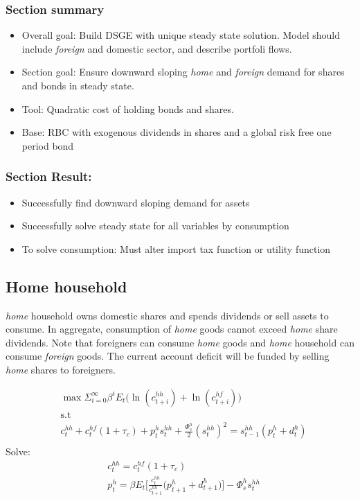 \documentclass[a4paper]{article}
\begin{document}
\subsubsection{Section summary}
\begin{itemize}
\item Overall goal: Build DSGE with unique steady state solution. Model should include \emph{foreign} and domestic sector, and describe portfoli flows. 
\item Section goal: Ensure downward sloping \emph{home} and \emph{foreign} demand for shares and bonds in steady state. 
\item Tool: Quadratic cost of holding bonds and shares. 
\item Base: RBC with exogenous dividends in shares and a global risk free one period bond
\end{itemize}

\subsubsection{Section Result:}
\begin{itemize}
\item Successfully find downward sloping demand for assets
\item Successfully solve steady state for all variables by consumption
\item To solve consumption: Must alter import tax function or utility function
\end{itemize}

\subsection{Home household}
\emph{home} household owns domestic shares and spends dividends or sell assets to consume. In aggregate, consumption of \emph{home} goods cannot exceed \emph{home} share dividends. Note that foreigners can consume \emph{home} goods and \emph{home} household can consume \emph{foreign} goods. The current account deficit will be funded by selling \emph{home} shares to foreigners. 

\begin{align*}
&\max \Sigma_{i=0}^\infty \beta^i E_t \bigg(\ln(c^{hh}_{t+i})+ \ln(c^{hf}_{t+i}) \bigg)\\ &\text{s.t}\\
&c^{hh}_t+c^{hf}_t(1+\tau_c)+ p^{h}_t s^{hh}_t+\frac{\Phi^h_s}{2}(s^{hh}_t)^2 =s^{hh}_{t-1}(p^{h}_t+d^{h}_t)\\
\end{align*}
Solve:
\begin{align}
&c^{hh}_t=c^{hf}_t(1+\tau_c)\\
&p^{h}_t=\beta E_t \bigg[\frac{c^{hh}_t}{c^{hh}_{t+1}} \bigg(  p^{h}_{t+1}+d^{h}_{t+1} \bigg) \bigg] - \Phi^h_s s^{hh}_t
\end{align}
\end{document}
